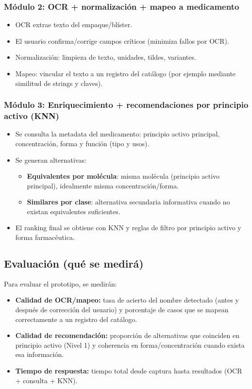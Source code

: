 \subsubsection{Módulo 2: OCR + normalización + mapeo a medicamento}
\begin{itemize}
	\item OCR extrae texto del empaque/blíster.
	\item El usuario confirma/corrige campos críticos (minimiza fallos por OCR).
	\item Normalización: limpieza de texto, unidades, tildes, variantes.
	\item Mapeo: vincular el texto a un registro del catálogo (por ejemplo mediante similitud de strings y claves).
\end{itemize}

\subsubsection{Módulo 3: Enriquecimiento + recomendaciones por principio activo (KNN)}
\begin{itemize}
	\item Se consulta la metadata del medicamento: principio activo principal, concentración, forma y función (tipo y usos).
	\item Se generan alternativas:
	\begin{itemize}
		\item \textbf{Equivalentes por molécula}: misma molécula (principio activo principal), idealmente misma concentración/forma.
		\item \textbf{Similares por clase}: alternativa secundaria informativa cuando no existan equivalentes suficientes.
	\end{itemize}
	\item El ranking final se obtiene con KNN y reglas de filtro por principio activo y forma farmacéutica.
\end{itemize}

\subsection{Evaluación (qué se medirá)}
Para evaluar el prototipo, se medirán:

\begin{itemize}
	\item \textbf{Calidad de OCR/mapeo:} tasa de acierto del nombre detectado (antes y después de corrección del usuario) y porcentaje de casos que se mapean correctamente a un registro del catálogo.
	\item \textbf{Calidad de recomendación:} proporción de alternativas que coinciden en principio activo (Nivel 1) y coherencia en forma/concentración cuando exista esa información.
	\item \textbf{Tiempo de respuesta:} tiempo total desde captura hasta resultados (OCR + consulta + KNN).
\end{itemize}

